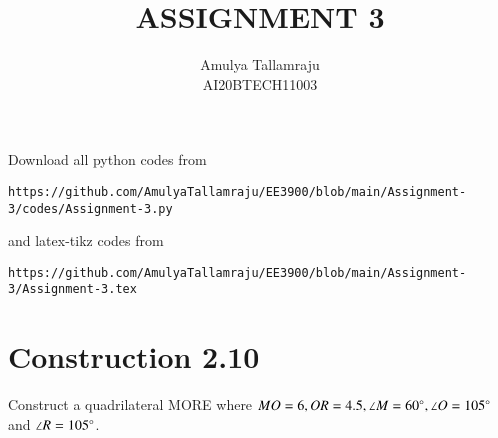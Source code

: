 \documentclass[journal,12pt,twocolumn]{IEEEtran}
\begin{document}
     \def\centbox#1{\makebox[0in]{#1}}
     \def\topbox#1{\raisebox{-\baselineskip}[0in][0in]{#1}}
     \def\midbox#1{\raisebox{-0.5\baselineskip}[0in][0in]{#1}}
\vspace{3cm}
\title{ASSIGNMENT 3}
\author{Amulya Tallamraju \\ AI20BTECH11003}
\maketitle
\newpage
\bigskip
\renewcommand{\thefigure}{\theenumi}
\renewcommand{\thetable}{\theenumi}
Download all python codes from 
\begin{lstlisting}
https://github.com/AmulyaTallamraju/EE3900/blob/main/Assignment-3/codes/Assignment-3.py
\end{lstlisting}
%
and latex-tikz codes from 
%
\begin{lstlisting}
https://github.com/AmulyaTallamraju/EE3900/blob/main/Assignment-3/Assignment-3.tex
\end{lstlisting}
\section{Construction 2.10}
Construct a quadrilateral MORE where $MO = 6, OR = 4.5, \angle M = 60 \degree, \angle O = 105 \degree$ and $\angle R = 105 \degree$.
%
\end{document}
